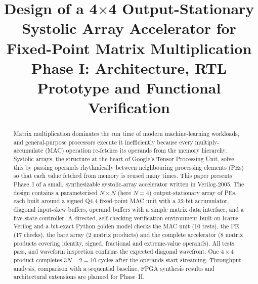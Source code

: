 \documentclass[conference]{IEEEtran}
\begin{document}
\title{Design of a 4$\times$4 Output-Stationary Systolic Array Accelerator for Fixed-Point Matrix Multiplication\\
\large Phase I: Architecture, RTL Prototype and Functional Verification}

\author{
\and
{}
\and
{}
\and
{}
\and
{}
\and
{}
}

\maketitle

\begin{abstract}
Matrix multiplication dominates the run time of modern machine-learning
workloads, and general-purpose processors execute it inefficiently because
every multiply-accumulate (MAC) operation re-fetches its operands from the
memory hierarchy. Systolic arrays, the structure at the heart of Google's
Tensor Processing Unit, solve this by passing operands rhythmically between
neighbouring processing elements (PEs) so that each value fetched from memory
is reused many times. This paper presents Phase~I of a small,
synthesizable systolic-array accelerator written in Verilog-2005. The design
contains a parameterised $N\times N$ (here $N=4$) output-stationary array of
PEs, each built around a signed Q4.4 fixed-point MAC unit with a 32-bit
accumulator, diagonal input-skew buffers, operand buffers with a simple
matrix data interface, and a five-state controller. A
directed, self-checking verification environment built on Icarus Verilog
and a bit-exact Python golden model checks the MAC unit (10 tests), the PE
(17 checks), the bare array (2 matrix products) and the complete
accelerator (8 matrix products covering identity, signed, fractional and
extreme-value operands). All tests pass, and waveform inspection confirms
the expected diagonal wavefront. One $4\times4$ product completes $3N-2=10$
cycles after the operands start streaming. Throughput analysis, comparison
with a sequential baseline, FPGA synthesis results and architectural
extensions are planned for Phase~II.
\end{abstract}
\end{document}
